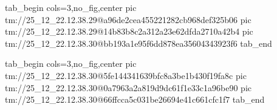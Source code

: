  
 
 
 
 

\qqSecOrig


\ifcmt
  tab_begin cols=3,no_fig,center
    pic tm://25_12_22.12.38.29@a96de2cea455221282cb968def325b06
    pic tm://25_12_22.12.38.29@14b83b8c2a312a23e62dfda2710a42b4
    pic tm://25_12_22.12.38.30@bb193a1e95f6dd878ea35604343923f6
  tab_end
\fi


\ifcmt
  tab_begin cols=3,no_fig,center
    pic tm://25_12_22.12.38.30@5fe144341639bfc8a3be1b430f19fa8c
    pic tm://25_12_22.12.38.30@0a7963a2a819d9dc61f1e33c1a96be90
    pic tm://25_12_22.12.38.30@66ffcca5c031be26694e41c661cfc1f7
  tab_end
\fi

